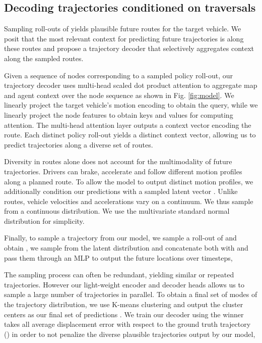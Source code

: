 \documentclass{article}
\begin{document}
\subsection{Decoding trajectories conditioned on traversals}
\label{sec:decoder}

Sampling roll-outs of  yields plausible future routes for the target vehicle. We posit that the most relevant context for predicting future trajectories is along these routes and propose a trajectory decoder that selectively aggregates context along the sampled routes. 

Given a sequence of nodes  corresponding to a sampled policy roll-out, our trajectory decoder uses multi-head scaled dot product attention \citep{vaswani2017attention} to aggregate map and agent context over the node sequence as shown in Fig. \ref{fig:model}. We linearly project the target vehicle's motion encoding to obtain the query, while we linearly project the node features  to obtain keys and values for computing attention. The multi-head attention layer outputs a context vector  encoding the route. Each distinct policy roll-out yields a distinct context vector, allowing us to predict trajectories along a diverse set of routes. 


Diversity in routes alone does not account for the multimodality of future trajectories. Drivers can brake, accelerate and follow different motion profiles along a planned route. To allow the model to output distinct motion profiles, we additionally condition our predictions with a sampled latent vector . Unlike routes, vehicle velocities and accelerations vary on a continuum. We thus sample  from a continuous distribution. We use the multivariate standard normal distribution for simplicity. 


Finally, to sample a trajectory  from our model, we sample a roll-out of  and obtain , we sample  from the latent distribution and concatenate both with  and pass them through an MLP to output  the future locations over  timesteps,

The sampling process can often be redundant, yielding similar or repeated trajectories. However our light-weight encoder and decoder heads allows us to sample a large number of trajectories in parallel. To obtain a final set of  modes of the trajectory distribution, we use K-means clustering and output the cluster centers as our final set of  predictions . We train our decoder using the winner takes all average displacement error with respect to the ground truth trajectory () in order to not penalize the diverse plausible trajectories output by our model, 
 
\end{document}
